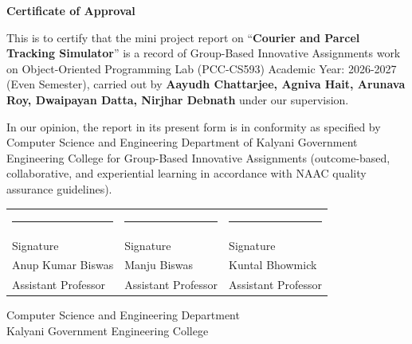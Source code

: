 \thispagestyle{plain}
\begin{center}
{\bfseries\fontsize{14}{17}\selectfont Certificate of Approval}
\end{center}
\vspace{1cm}

\noindent This is to certify that the mini project report on
\enquote{\textbf{Courier and Parcel Tracking Simulator}} is a record of Group-Based
Innovative Assignments work on Object-Oriented Programming Lab (PCC-CS593)
Academic Year: 2026-2027 (Even Semester), carried out by
\textbf{Aayudh Chattarjee, Agniva Hait, Arunava Roy, Dwaipayan Datta,
Nirjhar Debnath} under our supervision.

In our opinion, the report in its present form is in conformity as specified by
Computer Science and Engineering Department of Kalyani Government Engineering
College for Group-Based Innovative Assignments (outcome-based, collaborative,
and experiential learning in accordance with NAAC quality assurance guidelines).

\vspace{1.5cm}
\noindent
\begin{tabularx}{\textwidth}{@{}XXX@{}}
\rule{0pt}{1.4cm}\rule{0.85\linewidth}{0.4pt} & \rule{0.85\linewidth}{0.4pt} & \rule{0.85\linewidth}{0.4pt}\\
Signature & Signature & Signature\\[8pt]
Anup Kumar Biswas & Manju Biswas & Kuntal Bhowmick\\
Assistant Professor & Assistant Professor & Assistant Professor
\end{tabularx}

\vspace{0.8cm}
\begin{center}
Computer Science and Engineering Department\\
Kalyani Government Engineering College
\end{center}
\clearpage
